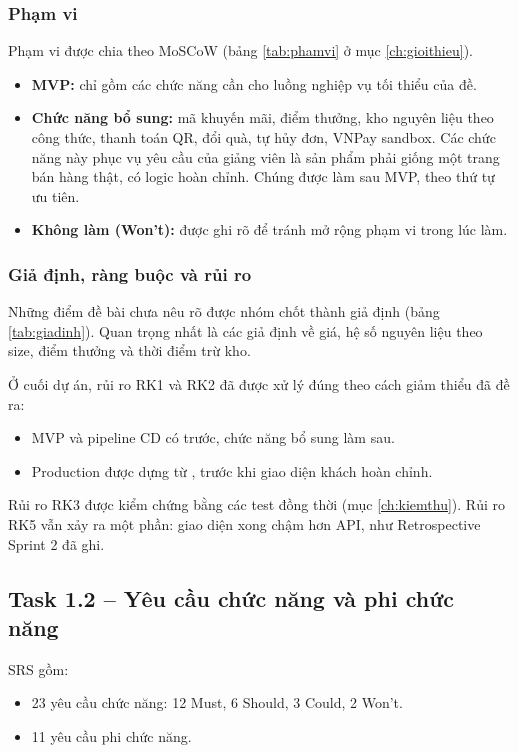 

\subsubsection{Phạm vi}
Phạm vi được chia theo MoSCoW (bảng \ref{tab:phamvi} ở mục \ref{ch:gioithieu}).
\begin{itemize}
\item \textbf{MVP:} chỉ gồm các chức năng cần cho luồng nghiệp vụ tối thiểu của đề.
\item \textbf{Chức năng bổ sung:} mã khuyến mãi, điểm thưởng, kho nguyên liệu theo công thức, thanh toán QR, đổi quà, tự hủy đơn, VNPay sandbox. Các chức năng này phục vụ yêu cầu của giảng viên là sản phẩm phải giống một trang bán hàng thật, có logic hoàn chỉnh. Chúng được làm sau MVP, theo thứ tự ưu tiên.
\item \textbf{Không làm (Won't):} được ghi rõ để tránh mở rộng phạm vi trong lúc làm.
\end{itemize}

\subsubsection{Giả định, ràng buộc và rủi ro}
Những điểm đề bài chưa nêu rõ được nhóm chốt thành giả định (bảng \ref{tab:giadinh}). Quan trọng nhất là các giả định về giá, hệ số nguyên liệu theo size, điểm thưởng và thời điểm trừ kho.





Ở cuối dự án, rủi ro RK1 và RK2 đã được xử lý đúng theo cách giảm thiểu đã đề ra:
\begin{itemize}
\item MVP và pipeline CD có trước, chức năng bổ sung làm sau.
\item Production được dựng từ , trước khi giao diện khách hoàn chỉnh.
\end{itemize}

Rủi ro RK3 được kiểm chứng bằng các test đồng thời (mục \ref{ch:kiemthu}). Rủi ro RK5 vẫn xảy ra một phần: giao diện xong chậm hơn API, như Retrospective Sprint 2 đã ghi.

\subsection{Task 1.2 -- Yêu cầu chức năng và phi chức năng}
SRS gồm:
\begin{itemize}
\item 23 yêu cầu chức năng: 12 Must, 6 Should, 3 Could, 2 Won't.
\item 11 yêu cầu phi chức năng.
\end{itemize}

